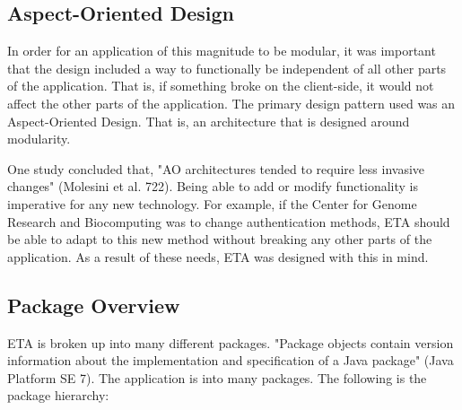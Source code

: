\documentclass[a4paper,12pt]{texMemo}
\begin{document}
\subsection{Aspect-Oriented Design}
In order for an application of this magnitude to be modular, it was important that the design included a way to functionally be independent of all other parts of the application. That is, if something broke on the client-side, it would not affect the other parts of the application. The primary design pattern used was an Aspect-Oriented Design. That is, an architecture that is designed around modularity. 

One study concluded that, "AO architectures tended to require less invasive changes" (Molesini et al. 722). Being able to add or modify functionality is imperative for any new technology. For example, if the Center for Genome Research and Biocomputing was to change authentication methods, ETA should be able to adapt to this new method without breaking any other parts of the application. As a result of these needs, ETA was designed with this in mind.

\subsection{Package Overview}
ETA is broken up into many different packages. "Package objects contain version information about the implementation and specification of a Java package" (Java Platform SE 7). The application is into many packages. The following is the package hierarchy:
\end{document}

